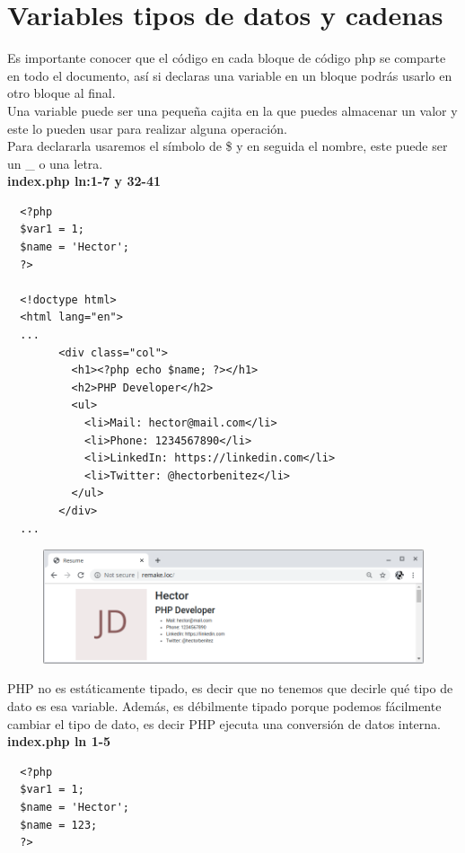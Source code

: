 \documentclass{article}
\begin{document}
\section{Variables tipos de datos y cadenas}%
Es importante conocer que el código en cada bloque de código php se comparte en
todo el documento, así si declaras una variable en un bloque podrás usarlo en
otro bloque al final.\\

Una variable puede ser una pequeña cajita en la que puedes almacenar un valor y
este lo pueden usar para realizar alguna operación.\\

Para declararla usaremos el símbolo de \$ y en seguida el nombre, este puede ser
un \_ o una letra.\\

\textbf{index.php  ln:1-7 y 32-41}
\begin{verbatim}
  <?php
  $var1 = 1;
  $name = 'Hector';
  ?>

  <!doctype html>
  <html lang="en">
  ...
        <div class="col">
          <h1><?php echo $name; ?></h1>
          <h2>PHP Developer</h2>
          <ul>
            <li>Mail: hector@mail.com</li>
            <li>Phone: 1234567890</li>
            <li>LinkedIn: https://linkedin.com</li>
            <li>Twitter: @hectorbenitez</li>
          </ul>
        </div>
  ...
\end{verbatim}

\begin{figure}[h!]
  \centering
  \includegraphics[scale=0.5]{./Pictures/012_variables.png}
\end{figure}

PHP no es estáticamente tipado, es decir que no tenemos que decirle qué tipo de
dato es esa variable. Además, es débilmente tipado porque podemos fácilmente
cambiar el tipo de dato, es decir PHP ejecuta una conversión de datos interna.\\

\textbf{index.php ln 1-5}
\begin{verbatim}
  <?php
  $var1 = 1;
  $name = 'Hector';
  $name = 123;
  ?>
\end{verbatim}
\end{document}
